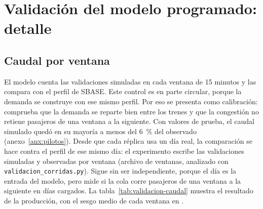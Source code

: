 \section{Validación del modelo programado: detalle}
\label{anx:validacion}

\subsection{Caudal por ventana}
\label{anx:caudal}

El modelo cuenta las validaciones simuladas en cada ventana de 15 minutos y las compara con el perfil de
SBASE. Este control es en parte circular, porque la demanda se construye con ese mismo perfil. Por eso se
presenta como calibración: comprueba que la demanda se reparte bien entre los trenes y que la congestión no
retiene pasajeros de una ventana a la siguiente. Con valores de prueba, el caudal simulado quedó en su
mayoría a menos del 6~\% del observado (anexo~\ref{anx:pilotos}).
Desde que cada réplica usa un día real, la comparación se hace contra el perfil de ese mismo día: el
experimento escribe las validaciones simuladas y observadas por ventana (archivo de ventanas, analizado con
\texttt{validacion\_corridas.py}). Sigue sin ser independiente, porque el día es la entrada del modelo, pero
mide si la cola corre pasajeros de una ventana a la siguiente en días cargados.
La tabla~\ref{tab:validacion-caudal} muestra el resultado de la producción, con el sesgo medio de cada ventana
en \EO{}.


